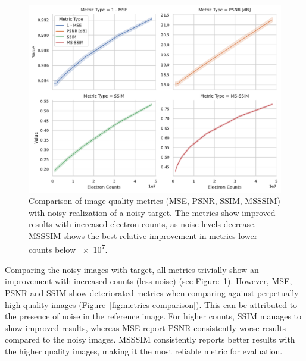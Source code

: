 \begin{figure}[h]
    \centering
    \includegraphics[width=1\linewidth]{images/metrics_comparison_same_target.pdf}
    \caption{Comparison of image quality metrics (\gls{MSE}, \gls{PSNR}, \gls{SSIM}, \gls{MSSSIM}) with noisy realization of a noisy target. The metrics show improved results with increased electron counts, as noise levels decrease. \gls{MSSSIM} shows the best relative improvement in metrics lower counts below \num{e7}.}
    \label{fig:metrics-comparison-noisy}
\end{figure}

Comparing the noisy images with target, all metrics trivially show an improvement with increased counts (less noise) (see Figure~\ref{fig:metrics-comparison-noisy}). However, \gls{MSE}, \gls{PSNR} and \gls{SSIM} show deteriorated metrics when comparing against perpetually high quality images (Figure~\ref{fig:metrics-comparison}). This can be attributed to the presence of noise in the reference image. For higher counts, \gls{SSIM} manages to show improved results, whereas \gls{MSE} report \gls{PSNR} consistently worse results compared to the noisy images. \gls{MSSSIM} consistently reports better results with the higher quality images, making it the most reliable metric for evaluation.


